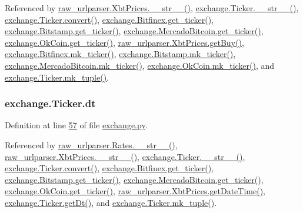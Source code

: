 Referenced by \hyperlink{raw__urlparser_8py_source_l00074}{raw\+\_\+urlparser.\+Xbt\+Prices.\+\_\+\+\_\+str\+\_\+\+\_\+()}, \hyperlink{exchange_8py_source_l00111}{exchange.\+Ticker.\+\_\+\+\_\+str\+\_\+\+\_\+()}, \hyperlink{exchange_8py_source_l00065}{exchange.\+Ticker.\+convert()}, \hyperlink{exchange_8py_source_l00332}{exchange.\+Bitfinex.\+get\+\_\+ticker()}, \hyperlink{exchange_8py_source_l00401}{exchange.\+Bitstamp.\+get\+\_\+ticker()}, \hyperlink{exchange_8py_source_l00535}{exchange.\+Mercado\+Bitcoin.\+get\+\_\+ticker()}, \hyperlink{exchange_8py_source_l00600}{exchange.\+Ok\+Coin.\+get\+\_\+ticker()}, \hyperlink{raw__urlparser_8py_source_l00062}{raw\+\_\+urlparser.\+Xbt\+Prices.\+get\+Buy()}, \hyperlink{exchange_8py_source_l00346}{exchange.\+Bitfinex.\+mk\+\_\+ticker()}, \hyperlink{exchange_8py_source_l00415}{exchange.\+Bitstamp.\+mk\+\_\+ticker()}, \hyperlink{exchange_8py_source_l00549}{exchange.\+Mercado\+Bitcoin.\+mk\+\_\+ticker()}, \hyperlink{exchange_8py_source_l00614}{exchange.\+Ok\+Coin.\+mk\+\_\+ticker()}, and \hyperlink{exchange_8py_source_l00096}{exchange.\+Ticker.\+mk\+\_\+tuple()}.

\subsubsection[{\texorpdfstring{dt}{dt}}]{\setlength{\rightskip}{0pt plus 5cm}exchange.\+Ticker.\+dt}\hypertarget{classexchange_1_1_ticker_a45e3162d9956cee797f21d93c44c6baf}{}\label{classexchange_1_1_ticker_a45e3162d9956cee797f21d93c44c6baf}


Definition at line \hyperlink{exchange_8py_source_l00057}{57} of file \hyperlink{exchange_8py_source}{exchange.\+py}.



Referenced by \hyperlink{raw__urlparser_8py_source_l00038}{raw\+\_\+urlparser.\+Rates.\+\_\+\+\_\+str\+\_\+\+\_\+()}, \hyperlink{raw__urlparser_8py_source_l00074}{raw\+\_\+urlparser.\+Xbt\+Prices.\+\_\+\+\_\+str\+\_\+\+\_\+()}, \hyperlink{exchange_8py_source_l00111}{exchange.\+Ticker.\+\_\+\+\_\+str\+\_\+\+\_\+()}, \hyperlink{exchange_8py_source_l00065}{exchange.\+Ticker.\+convert()}, \hyperlink{exchange_8py_source_l00332}{exchange.\+Bitfinex.\+get\+\_\+ticker()}, \hyperlink{exchange_8py_source_l00401}{exchange.\+Bitstamp.\+get\+\_\+ticker()}, \hyperlink{exchange_8py_source_l00535}{exchange.\+Mercado\+Bitcoin.\+get\+\_\+ticker()}, \hyperlink{exchange_8py_source_l00600}{exchange.\+Ok\+Coin.\+get\+\_\+ticker()}, \hyperlink{raw__urlparser_8py_source_l00059}{raw\+\_\+urlparser.\+Xbt\+Prices.\+get\+Date\+Time()}, \hyperlink{exchange_8py_source_l00093}{exchange.\+Ticker.\+get\+Dt()}, and \hyperlink{exchange_8py_source_l00096}{exchange.\+Ticker.\+mk\+\_\+tuple()}.

